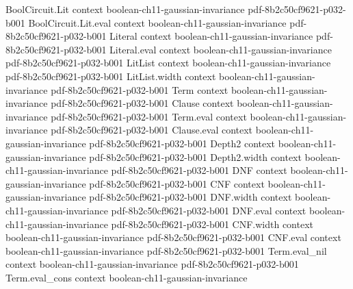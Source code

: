 \begin{theorem}
\leanok
{}
\proofstep
  {BoolCircuit.Lit}
  {context}
  {boolean-ch11-gaussian-invariance}
  {pdf-8b2c50cf9621-p032-b001}
\proofstep
  {BoolCircuit.Lit.eval}
  {context}
  {boolean-ch11-gaussian-invariance}
  {pdf-8b2c50cf9621-p032-b001}
\proofstep
  {Literal}
  {context}
  {boolean-ch11-gaussian-invariance}
  {pdf-8b2c50cf9621-p032-b001}
\proofstep
  {Literal.eval}
  {context}
  {boolean-ch11-gaussian-invariance}
  {pdf-8b2c50cf9621-p032-b001}
\proofstep
  {LitList}
  {context}
  {boolean-ch11-gaussian-invariance}
  {pdf-8b2c50cf9621-p032-b001}
\proofstep
  {LitList.width}
  {context}
  {boolean-ch11-gaussian-invariance}
  {pdf-8b2c50cf9621-p032-b001}
\proofstep
  {Term}
  {context}
  {boolean-ch11-gaussian-invariance}
  {pdf-8b2c50cf9621-p032-b001}
\proofstep
  {Clause}
  {context}
  {boolean-ch11-gaussian-invariance}
  {pdf-8b2c50cf9621-p032-b001}
\proofstep
  {Term.eval}
  {context}
  {boolean-ch11-gaussian-invariance}
  {pdf-8b2c50cf9621-p032-b001}
\proofstep
  {Clause.eval}
  {context}
  {boolean-ch11-gaussian-invariance}
  {pdf-8b2c50cf9621-p032-b001}
\proofstep
  {Depth2}
  {context}
  {boolean-ch11-gaussian-invariance}
  {pdf-8b2c50cf9621-p032-b001}
\proofstep
  {Depth2.width}
  {context}
  {boolean-ch11-gaussian-invariance}
  {pdf-8b2c50cf9621-p032-b001}
\proofstep
  {DNF}
  {context}
  {boolean-ch11-gaussian-invariance}
  {pdf-8b2c50cf9621-p032-b001}
\proofstep
  {CNF}
  {context}
  {boolean-ch11-gaussian-invariance}
  {pdf-8b2c50cf9621-p032-b001}
\proofstep
  {DNF.width}
  {context}
  {boolean-ch11-gaussian-invariance}
  {pdf-8b2c50cf9621-p032-b001}
\proofstep
  {DNF.eval}
  {context}
  {boolean-ch11-gaussian-invariance}
  {pdf-8b2c50cf9621-p032-b001}
\proofstep
  {CNF.width}
  {context}
  {boolean-ch11-gaussian-invariance}
  {pdf-8b2c50cf9621-p032-b001}
\proofstep
  {CNF.eval}
  {context}
  {boolean-ch11-gaussian-invariance}
  {pdf-8b2c50cf9621-p032-b001}
\proofstep
  {Term.eval_nil}
  {context}
  {boolean-ch11-gaussian-invariance}
  {pdf-8b2c50cf9621-p032-b001}
\proofstep
  {Term.eval_cons}
  {context}
  {boolean-ch11-gaussian-invariance}

\end{theorem}
